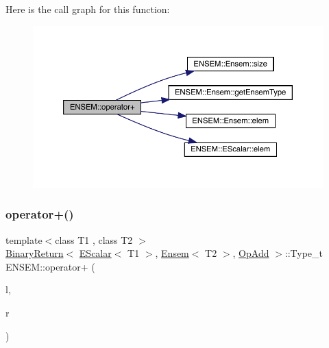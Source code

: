 Here is the call graph for this function\+:\nopagebreak
\begin{figure}[H]
\begin{center}
\leavevmode
\includegraphics[width=350pt]{d1/d9e/group__eensem_ga370913e6f39a2b7be0ce0b78f156978a_cgraph}
\end{center}
\end{figure}
\mbox{\label{group__eensem_ga28163898a2dffc17215669f8a85d65b4}} 
\subsubsection{\texorpdfstring{operator+()}{operator+()}\hspace{0.1cm}{\footnotesize\ttfamily [4/4]}}
{\footnotesize\ttfamily template$<$class T1 , class T2 $>$ \\
\mbox{\hyperlink{structENSEM_1_1BinaryReturn}{Binary\+Return}}$<$ \mbox{\hyperlink{classENSEM_1_1EScalar}{E\+Scalar}}$<$ T1 $>$, \mbox{\hyperlink{classENSEM_1_1Ensem}{Ensem}}$<$ T2 $>$, \mbox{\hyperlink{structENSEM_1_1OpAdd}{Op\+Add}} $>$\+::Type\+\_\+t E\+N\+S\+E\+M\+::operator+ (\begin{DoxyParamCaption}\item[{const \mbox{\hyperlink{classENSEM_1_1EScalar}{E\+Scalar}}$<$ T1 $>$ \&}]{l,  }\item[{const \mbox{\hyperlink{classENSEM_1_1Ensem}{Ensem}}$<$ T2 $>$ \&}]{r }\end{DoxyParamCaption})\hspace{0.3cm}{\ttfamily [inline]}}

